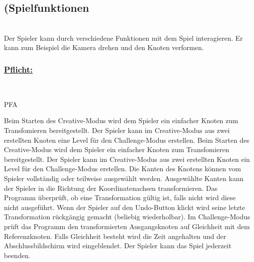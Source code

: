 %
%


\subsection{(Spielfunktionen}

%
%
\renewcommand{\K}{}
%
%

~\\
Der Spieler kann durch verschiedene Funktionen mit dem Spiel interagieren. Er kann zum Beispiel die Kamera drehen und den Knoten verformen. 
\\

%
%
\subsubsection*{\underline{Pflicht:}}~\\

\begin{ids}{\gls{PFA\K}}

	\id[ 90] Beim Starten des Creative-Modus wird dem Spieler ein einfacher Knoten zum Transfomieren bereitgestellt.
 	\id[100] Der Spieler kann im Creative-Modus aus zwei erstellten Knoten eine Level für den Challenge-Modus erstellen.
 	\id[ 110] Beim Starten des Creative-Modus wird dem Spieler ein einfacher Knoten  zum Transfomieren bereitgestellt.
 	\id[ 120] Der Spieler kann im Creative-Modus aus zwei erstellten Knoten ein Level für den Challenge-Modus erstellen.
 	\id[ 130] Die Kanten des Knotens können vom Spieler vollständig oder teilweise ausgewählt werden.
 	\id[ 140] Ausgewählte Kanten kann der Spieler in die Richtung der Koordinatenachsen transformieren.
 	\id[ 150] Das Programm überprüft, ob eine Transformation gültig ist, falls nicht wird diese nicht ausgeführt.
 	\id[ 160] Wenn der Spieler auf den Undo-Button klickt wird seine letzte Transformation rückgängig gemacht (beliebig wiederholbar). 
 	\id[ 170] Im Challenge-Modus prüft das Programm den transformierten Ausgangsknoten auf Gleichheit mit dem Referenzknoten. Falls Gleichheit besteht wird die Zeit angehalten und der Abschlussbildschirm wird eingeblendet.
 	\id[ 180] Der Spieler kann das Spiel jederzeit beenden.
 	
 	
 	
	
\end{ids}

~\\


